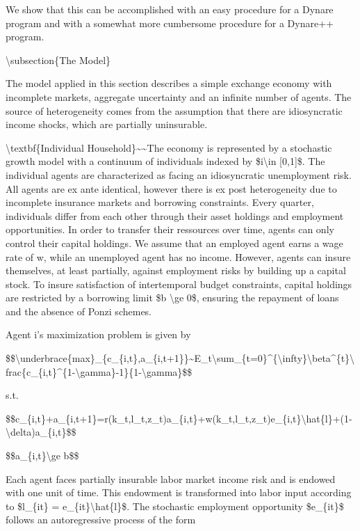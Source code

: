 \documentclass[10pt,math=newtx,citestyle=gb7714-2015,bibstyle=gb7714-2015]{elegantbook}
\begin{document}
	We show that this can be accomplished with an easy procedure for a Dynare program and with a somewhat more cumbersome procedure for a Dynare++ program.
	
	\textbackslash{}subsection\{The Model\}
	
	The model applied in this section describes a simple exchange economy with incomplete markets, aggregate uncertainty and an infinite number of agents. The source of heterogeneity comes from the assumption that there are idiosyncratic income shocks, which are partially uninsurable.
	
	\textbackslash{}textbf\{Individual Household\}\~{}\~{}The economy is represented by a stochastic growth model with a continuum of individuals indexed by \$i\textbackslash{}in [0,1]\$. The individual agents are characterized as facing an idiosyncratic unemployment risk. All agents are ex ante identical, however there is ex post heterogeneity due to incomplete insurance markets and borrowing constraints. Every quarter, individuals differ from each other through their asset holdings and employment opportunities. In order to transfer their ressources over time, agents can only control their capital holdings. We assume that an employed agent earns a wage rate of w, while an unemployed agent has no income. However, agents can insure themselves, at least partially,
	against employment risks by building up a capital stock. To insure satisfaction of intertemporal budget constraints, capital holdings are restricted by a borrowing limit \$b \textbackslash{}ge 0\$, ensuring the repayment of loans and the absence of Ponzi schemes.
	
	Agent i’s maximization problem is given by
	
	\$\$\textbackslash{}underbrace\{max\}\_\{c\_\{i,t\},a\_\{i,t+1\}\}\~{}E\_t\textbackslash{}sum\_\{t=0\}\^{}\{\textbackslash{}infty\}\textbackslash{}beta\^{}\{t\}\textbackslash{}frac\{c\_\{i,t\}\^{}\{1-\textbackslash{}gamma\}-1\}\{1-\textbackslash{}gamma\}\$\$
	
	s.t.
	
	\$\$c\_\{i,t\}+a\_\{i,t+1\}=r(k\_t,l\_t,z\_t)a\_\{i,t\}+w(k\_t,l\_t,z\_t)e\_\{i,t\}\textbackslash{}hat\{l\}+(1-\textbackslash{}delta)a\_\{i,t\}\$\$
	
	\$\$a\_\{i,t\}\textbackslash{}ge b\$\$
	
	Each agent faces partially insurable labor market income risk and is endowed with one unit of time. This endowment is transformed into labor input according to \$l\_\{it\} = e\_\{it\}\textbackslash{}hat\{l\}\$. The stochastic employment opportunity \$e\_\{it\}\$ follows an autoregressive process of the form
	
\end{document}
